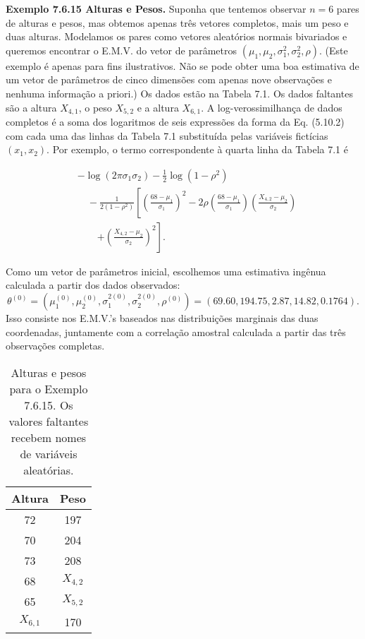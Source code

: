 \textbf{Exemplo 7.6.15 Alturas e Pesos.} Suponha que tentemos observar $n=6$ pares de alturas e pesos, mas obtemos apenas três vetores completos, mais um peso e duas alturas. Modelamos os pares como vetores aleatórios normais bivariados e queremos encontrar o E.M.V. do vetor de parâmetros $(\mu_1, \mu_2, \sigma_1^2, \sigma_2^2, \rho)$. (Este exemplo é apenas para fins ilustrativos. Não se pode obter uma boa estimativa de um vetor de parâmetros de cinco dimensões com apenas nove observações e nenhuma informação a priori.) Os dados estão na Tabela 7.1. Os dados faltantes são a altura $X_{4,1}$, o peso $X_{5,2}$ e a altura $X_{6,1}$. A log-verossimilhança de dados completos é a soma dos logaritmos de seis expressões da forma da Eq. (5.10.2) com cada uma das linhas da Tabela 7.1 substituída pelas variáveis fictícias $(x_1, x_2)$. Por exemplo, o termo correspondente à quarta linha da Tabela 7.1 é

\begin{equation}
\begin{split}
& -\log(2\pi\sigma_1\sigma_2) - \frac{1}{2}\log(1-\rho^2) \\
& \quad - \frac{1}{2(1-\rho^2)}\left[ \left(\frac{68-\mu_1}{\sigma_1}\right)^2 - 2\rho\left(\frac{68-\mu_1}{\sigma_1}\right)\left(\frac{X_{4,2}-\mu_2}{\sigma_2}\right) \right. \\
& \qquad \left. + \left(\frac{X_{4,2}-\mu_2}{\sigma_2}\right)^2 \right].
\end{split}
\tag{7.6.12}
\end{equation}

Como um vetor de parâmetros inicial, escolhemos uma estimativa ingênua calculada a partir dos dados observados:
$$ \theta^{(0)} = (\mu_1^{(0)}, \mu_2^{(0)}, \sigma_1^{2(0)}, \sigma_2^{2(0)}, \rho^{(0)}) = (69.60, 194.75, 2.87, 14.82, 0.1764). $$
Isso consiste nos E.M.V.'s baseados nas distribuições marginais das duas coordenadas, juntamente com a correlação amostral calculada a partir das três observações completas.

\begin{table}[h]
\centering
\caption{Alturas e pesos para o Exemplo 7.6.15. Os valores faltantes recebem nomes de variáveis aleatórias.}
\begin{tabular}{|c|c|}
\hline
\textbf{Altura} & \textbf{Peso} \\
\hline
72 & 197 \\
70 & 204 \\
73 & 208 \\
68 & $X_{4,2}$ \\
65 & $X_{5,2}$ \\
$X_{6,1}$ & 170 \\
\hline
\end{tabular}
\label{tab:height_weight}
\end{table}

